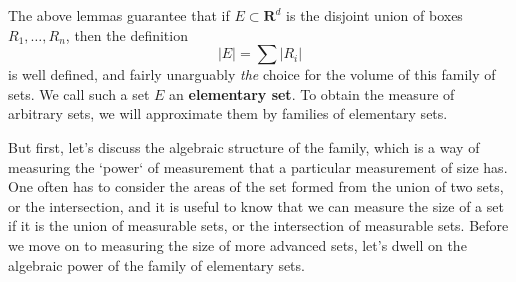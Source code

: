%


%

The above lemmas guarantee that if $E \subset \mathbf{R}^d$ is the disjoint union of boxes $R_1, \dots, R_n$, then the definition
%
\[ |E| = \sum |R_i| \]
%
is well defined, and fairly unarguably {\it the} choice for the volume of this family of sets. We call such a set $E$ an {\bf elementary set}. To obtain the measure of arbitrary sets, we will approximate them by families of elementary sets.

But first, let's discuss the algebraic structure of the family, which is a way of measuring the `power` of measurement that a particular measurement of size has.  One often has to consider the areas of the set formed from the union of two sets, or the intersection, and it is useful to know that we can measure the size of a set if it is the union of measurable sets, or the intersection of measurable sets. Before we move on to measuring the size of more advanced sets, let's dwell on the algebraic power of the family of elementary sets.

